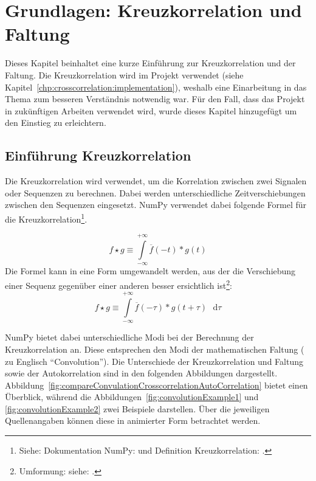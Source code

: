\chapter{Grundlagen: Kreuzkorrelation und Faltung}
Dieses Kapitel beinhaltet eine kurze Einführung zur Kreuzkorrelation und der Faltung.
Die Kreuzkorrelation wird im Projekt verwendet (siehe Kapitel~\ref{chp:crosscorrelation:implementation}), weshalb eine Einarbeitung in das Thema zum besseren Verständnis notwendig war.
Für den Fall, dass das Projekt in zukünftigen Arbeiten verwendet wird, wurde dieses Kapitel hinzugefügt um den Einstieg zu erleichtern.


\section{Einführung Kreuzkorrelation}
Die Kreuzkorrelation wird verwendet, um die Korrelation zwischen zwei Signalen oder Sequenzen zu berechnen. Dabei werden unterschiedliche Zeitverschiebungen zwischen
den Sequenzen eingesetzt. NumPy verwendet dabei folgende Formel für die 
Kreuzkorrelation\footnote{ Siehe: Dokumentation NumPy:\cite{DocumentationNumpyCorrelate} und Definition Kreuzkorrelation: \cite{DefinitionCrossCorrelation}.}.

\[
  f \star g \equiv \int\limits_{-\infty}^{+\infty} \overline{f}(-t)*g(t)
\]
Die Formel kann in eine Form umgewandelt werden, aus der die Verschiebung einer Sequenz gegenüber einer anderen besser ersichtlich 
ist\footnote{ Umformung: siehe: \cite{DefinitionCrossCorrelation}.}:
\[
  f \star g \equiv \int\limits_{-\infty}^{+\infty} \overline{f}(-\tau)*g(t + \tau) \text{ } \mathrm{d}\tau
\]

NumPy bietet dabei unterschiedliche Modi bei der Berechnung der Kreuzkorrelation an. Diese entsprechen den Modi der mathematischen Faltung ( zu Englisch \enquote{Convolution}).
Die Unterschiede der Kreuzkorrelation und Faltung sowie der Autokorrelation sind in den folgenden Abbildungen dargestellt.
Abbildung~\ref{fig:compareConvulationCrosscorrelationAutoCorrelation} bietet einen Überblick, während die Abbildungen~\ref{fig:convolutionExample1} und \ref{fig:convolutionExample2} zwei Beispiele darstellen.
Über die jeweiligen Quellenangaben können diese in animierter Form betrachtet werden.


